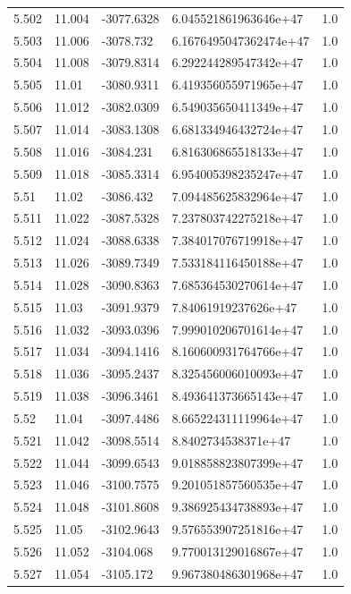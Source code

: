 \begin{tabular}{lllll}
5.502 & 11.004 & -3077.6328 & 6.045521861963646e+47 & 1.0 \\
5.503 & 11.006 & -3078.732 & 6.1676495047362474e+47 & 1.0 \\
5.504 & 11.008 & -3079.8314 & 6.292244289547342e+47 & 1.0 \\
5.505 & 11.01 & -3080.9311 & 6.419356055971965e+47 & 1.0 \\
5.506 & 11.012 & -3082.0309 & 6.549035650411349e+47 & 1.0 \\
5.507 & 11.014 & -3083.1308 & 6.681334946432724e+47 & 1.0 \\
5.508 & 11.016 & -3084.231 & 6.816306865518133e+47 & 1.0 \\
5.509 & 11.018 & -3085.3314 & 6.954005398235247e+47 & 1.0 \\
5.51 & 11.02 & -3086.432 & 7.094485625832964e+47 & 1.0 \\
5.511 & 11.022 & -3087.5328 & 7.237803742275218e+47 & 1.0 \\
5.512 & 11.024 & -3088.6338 & 7.384017076719918e+47 & 1.0 \\
5.513 & 11.026 & -3089.7349 & 7.533184116450188e+47 & 1.0 \\
5.514 & 11.028 & -3090.8363 & 7.685364530270614e+47 & 1.0 \\
5.515 & 11.03 & -3091.9379 & 7.84061919237626e+47 & 1.0 \\
5.516 & 11.032 & -3093.0396 & 7.999010206701614e+47 & 1.0 \\
5.517 & 11.034 & -3094.1416 & 8.160600931764766e+47 & 1.0 \\
5.518 & 11.036 & -3095.2437 & 8.325456006010093e+47 & 1.0 \\
5.519 & 11.038 & -3096.3461 & 8.493641373665143e+47 & 1.0 \\
5.52 & 11.04 & -3097.4486 & 8.665224311119964e+47 & 1.0 \\
5.521 & 11.042 & -3098.5514 & 8.8402734538371e+47 & 1.0 \\
5.522 & 11.044 & -3099.6543 & 9.018858823807399e+47 & 1.0 \\
5.523 & 11.046 & -3100.7575 & 9.201051857560535e+47 & 1.0 \\
5.524 & 11.048 & -3101.8608 & 9.386925434738893e+47 & 1.0 \\
5.525 & 11.05 & -3102.9643 & 9.576553907251816e+47 & 1.0 \\
5.526 & 11.052 & -3104.068 & 9.770013129016867e+47 & 1.0 \\
5.527 & 11.054 & -3105.172 & 9.967380486301968e+47 & 1.0 \\

\end{tabular}
